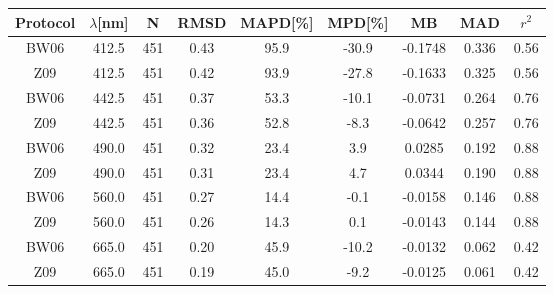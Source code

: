 \documentclass[preview]{standalone}
\begin{document}
\small

\begin{table}
\begin{tabular}{ccccccccc}

\hline
Protocol & $\lambda$[nm]  & N     & RMSD  &MAPD[\%]&MPD[\%]& MB     & MAD    & $r^2$ \\\hline
 
        BW06 &       412.5 &  451 &  0.43 &  95.9 & -30.9 & -0.1748 &  0.336 &  0.56 \\
         Z09 &       412.5 &  451 &  0.42 &  93.9 & -27.8 & -0.1633 &  0.325 &  0.56 \\\hline
        BW06 &       442.5 &  451 &  0.37 &  53.3 & -10.1 & -0.0731 &  0.264 &  0.76 \\
         Z09 &       442.5 &  451 &  0.36 &  52.8 &  -8.3 & -0.0642 &  0.257 &  0.76 \\\hline
        BW06 &       490.0 &  451 &  0.32 &  23.4 &   3.9 &  0.0285 &  0.192 &  0.88 \\
         Z09 &       490.0 &  451 &  0.31 &  23.4 &   4.7 &  0.0344 &  0.190 &  0.88 \\\hline
        BW06 &       560.0 &  451 &  0.27 &  14.4 &  -0.1 & -0.0158 &  0.146 &  0.88 \\
         Z09 &       560.0 &  451 &  0.26 &  14.3 &   0.1 & -0.0143 &  0.144 &  0.88 \\\hline
        BW06 &       665.0 &  451 &  0.20 &  45.9 & -10.2 & -0.0132 &  0.062 &  0.42 \\
         Z09 &       665.0 &  451 &  0.19 &  45.0 &  -9.2 & -0.0125 &  0.061 &  0.42 \\\hline


\end{tabular}
\end{table}
\end{document}
